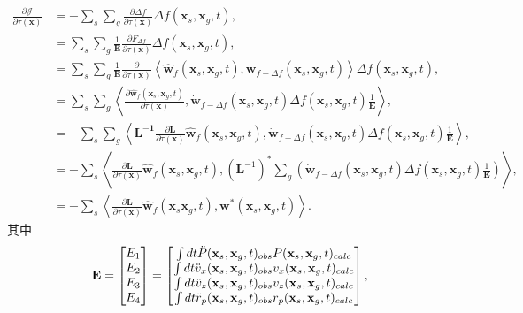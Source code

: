 \begin{equation}
	\begin{aligned}
		\frac{\partial \mathcal{J}}{\partial \tau(\mathbf{x})} &= -\sum_s \sum_g 
		\frac{\partial \Delta f}{\partial \tau(\mathbf{x})}
		\Delta f(\mathbf{x}_s,\mathbf{x}_g,t), \\
		&=\sum_s \sum_g \frac{1}{\mathbf{E}}\frac{\partial \dot{F}_{\Delta f}}
		{\partial \tau(\mathbf{x})} \Delta f(\mathbf{x}_s,\mathbf{x}_g,t), \\
		&= \sum_s \sum_g \frac{1}{\mathbf{E}}\frac{\partial}{\partial \tau(\mathbf{x})}
		\left\langle \hat{\mathbf{w}}_f(\mathbf{x}_s,\mathbf{x}_g,t), 
		\dot{\mathbf{w}}_{f-\Delta f}(\mathbf{x}_s,\mathbf{x}_g,t) \right\rangle 
		\Delta f(\mathbf{x}_s,\mathbf{x}_g,t), \\
		&= \sum_s \sum_g\left\langle \frac{\partial \hat{\mathbf{w}}_f(\mathbf{x}_s,\mathbf{x}_g,t)}
		{\partial \tau(\mathbf{x})},\dot{\mathbf{w}}_{f-\Delta f}(\mathbf{x}_s,\mathbf{x}_g,t)
		\Delta f(\mathbf{x}_s,\mathbf{x}_g,t)\frac{1}{\mathbf{E}}\right\rangle, \\
		&= -\sum_s \sum_g\left\langle \mathbf{L^{-1}}\frac{\partial \mathbf{L}}{\partial \tau(\mathbf{x})}
		\hat{\mathbf{w}}_f(\mathbf{x}_s,\mathbf{x}_g,t),\dot{\mathbf{w}}_{f-\Delta f}(
		\mathbf{x}_s,\mathbf{x}_g,t)\Delta f(\mathbf{x}_s,\mathbf{x}_g,t)\frac{1}{\mathbf{E}}\right\rangle, \\
		&=-\sum_s\left\langle\frac{\partial \mathbf{L}}{\partial \tau(\mathbf{x})}
		\hat{\mathbf{w}}_f(\mathbf{x}_s,\mathbf{x}_g,t),(\mathbf{L}^{-1})^\ast\sum_g
		\left(\dot{\mathbf{w}}_{f-\Delta f}(\mathbf{x}_s,\mathbf{x}_g,t)
		\Delta f(\mathbf{x}_s,\mathbf{x}_g,t)\frac{1}{\mathbf{E}}\right)\right\rangle, \\
		&=-\sum_s\left\langle \frac{\partial \mathbf{L}}{\partial \tau(\mathbf{x})}
		\hat{\mathbf{w}}_f(\mathbf{x}_s\mathbf{x}_g,t),
		\mathbf{w}^\ast(\mathbf{x}_s,\mathbf{x}_g,t)\right\rangle.
	\end{aligned}
	\label{eq:ad_algrithm}
\end{equation}
\newpage
\hspace{-2em}其中
\begin{equation}
	\mathbf{E}=\begin{bmatrix} E_1 \cr E_2 \cr E_3 \cr E_4 \end{bmatrix}
		=\begin{bmatrix} \int dt \ddot{P}(\mathbf{x}_s,\mathbf{x}_g,t)_{obs}
		P(\mathbf{x}_s,\mathbf{x}_g,t)_{calc} \cr 
	\int dt \ddot{v}_x(\mathbf{x}_s,\mathbf{x}_g,t)_{obs}v_x(\mathbf{x}_s,\mathbf{x}_g,t)_{calc} \cr 
	\int dt \ddot{v}_z(\mathbf{x}_s,\mathbf{x}_g,t)_{obs}v_z(\mathbf{x}_s,\mathbf{x}_g,t)_{calc} \cr 
	\int dt \ddot{r}_p(\mathbf{x}_s,\mathbf{x}_g,t)_{obs}r_p(\mathbf{x}_s,\mathbf{x}_g,t)_{calc} 
		\end{bmatrix},
\end{equation}
